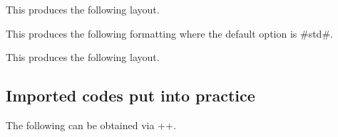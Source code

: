 

\begin{tdocexa}
    \leavevmode

    \begin{tdoclatex}[code]
    \end{tdoclatex}

    This produces the following layout.

\end{tdocexa}




\begin{tdocexa}[Following]
    \leavevmode

    \begin{tdoclatex}[code]
    \end{tdoclatex}

    This produces the following formatting where the default option is \tdocinlatex#std#.

\end{tdocexa}




\begin{tdocexa}
    \leavevmode

    \begin{tdoclatex}[code]
    \end{tdoclatex}

    This produces the following layout.

\end{tdocexa}




\subsection{Imported codes put into practice} \label{tdoc-latexshow}

\begin{tdocexa}[Showcase]
    The following can be obtained via \tdocinlatex++.

    \medskip

    \begin{tdoc-doc-showcase}
    \end{tdoc-doc-showcase}
\end{tdocexa}


